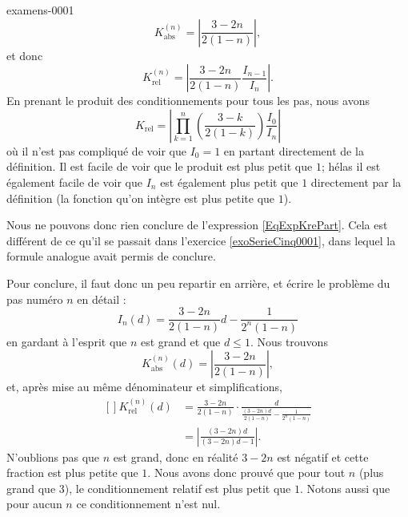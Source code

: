 \begin{corrige}{examens-0001}
	\begin{equation}
		K_{\text{abs}}^{(n)}=|\frac{ 3-2n }{ 2(1-n) }|,
	\end{equation}
	et donc
	\begin{equation}
		K_{\text{rel}}^{(n)}=|\frac{ 3-2n }{ 2(1-n) }\frac{ I_{n-1} }{ I_n }|.
	\end{equation}
	En prenant le produit des conditionnements pour tous les pas, nous avons
	\begin{equation}		\label{EqExpKrePart}
		K_{\text{rel}}=|\prod_{k=1}^n\left( \frac{ 3-k }{ 2(1-k) } \right)\frac{ I_0 }{ I_n }|
	\end{equation}
	où il n'est pas compliqué de voir que $I_0=1$ en partant directement de la définition. Il est facile de voir que le produit est plus petit que $1$; hélas il est également facile de voir que $I_n$ est également plus petit que $1$ directement par la définition (la fonction qu'on intègre est plus petite que $1$).

	Nous ne pouvons donc rien conclure de l'expression \eqref{EqExpKrePart}. Cela est différent de ce qu'il se passait dans l'exercice \ref{exoSerieCinq0001}, dans lequel la formule analogue avait permis de conclure.

	Pour conclure, il faut donc un peu repartir en arrière, et écrire le problème du pas numéro $n$ en détail :
	\begin{equation}
		I_n(d)=\frac{ 3-2n }{ 2(1-n) }d-\frac{1}{ 2^n(1-n) }
	\end{equation}
	en gardant à l'esprit que $n$ est grand et que $d\leq 1$. Nous trouvons
	\begin{equation}
		K_{\text{abs}}^{(n)}(d)=\left| \frac{ 3-2n }{ 2(1-n) } \right|,
	\end{equation}
	et, après mise au même dénominateur et simplifications, 
	\begin{equation}
		\begin{aligned}[]
			K_{\text{rel}}^{(n)}(d)&=\frac{ 3-2n }{ 2(1-n) }\cdot \frac{ d }{ \frac{ (3-2n)d }{ 2(1-n) }-\frac{1}{ 2^n(1-n) } }\\
			&=\left| \frac{ (3-2n)d }{ (3-2n)d-1 } \right|.
		\end{aligned}
	\end{equation}
	N'oublions pas que $n$ est grand, donc en réalité $3-2n$ est négatif et cette fraction est plus petite que $1$. Nous avons donc prouvé que pour tout $n$ (plus grand que $3$), le conditionnement relatif est plus petit que $1$. Notons aussi que pour aucun $n$ ce conditionnement n'est nul.

\end{corrige}
